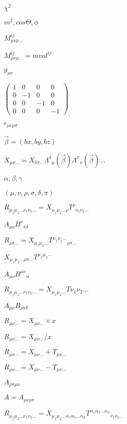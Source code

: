 \documentclass{article}
\begin{document}
$\chi^{2}$
\pagebreak

$m^2,cos\Theta, \phi$
\pagebreak

$ M^{ij}_{\mu\nu\rho\ldots} $
\pagebreak

$ M^{ij}_{\mu\nu\rho\ldots} = mval^{ij} $
\pagebreak

$ g_{\mu\nu} $
\pagebreak

$ \left(\begin{array}{cccc} 1&0&0&0\\0&-1&0&0\\0&0&-1&0\\0&0&0&-1 \end{array}\right) $
\pagebreak

$\epsilon_{\mu\nu\rho\sigma}$
\pagebreak

$\vec{\beta}=(bx,by,bz)$
\pagebreak

$ X_{\mu\nu\ldots} = X_{\delta\pi\ldots} \Lambda^{\delta}{}_{\mu}(\vec{\beta})\Lambda^{\pi}{}_{\nu}(\vec{\beta}) \ldots $
\pagebreak

$ \alpha,\beta,\gamma $
\pagebreak

$ (\mu,\nu,\rho,\sigma,\delta,\pi) $
\pagebreak

$ R_{\mu_1\mu_2\ldots\nu_1\nu_2\ldots} = X_{\mu_1\mu_2\ldots\rho} T^{\rho}{}_{\nu_1\nu_2\ldots} $
\pagebreak

$ A_{\mu\nu} B^{\nu}{}_{\pi\delta} $
\pagebreak

$ R_{\rho\pi\ldots} = X_{\mu_1\mu_2\ldots} T^{\mu_1\mu_2\ldots}{}_{\rho\pi\ldots} $
\pagebreak

$ X_{\mu_1\mu_2\ldots\rho\pi\ldots} T^{\mu_1\mu_2\ldots} $
\pagebreak

$ A_{\mu\nu} B^{\mu\nu}{}_{\alpha} $
\pagebreak

$ R_{\mu_1\mu_2\ldots\nu_1\nu_2\ldots} = X_{\mu_1\mu_2\ldots} T{\nu_1\nu_2\ldots} $
\pagebreak

$ A_{\mu\nu} B_{\rho\pi\delta} $
\pagebreak

$ R_{\mu\nu\ldots} = X_{\mu\nu\ldots} \times x $
\pagebreak

$ R_{\mu\nu\ldots} = X_{\mu\nu\ldots} / x $
\pagebreak

$ R_{\mu\nu\ldots} = X_{\mu\nu\ldots} + T_{\mu\nu\ldots} $
\pagebreak

$ R_{\mu\nu\ldots} = X_{\mu\nu\ldots} - T_{\mu\nu\ldots} $
\pagebreak

$ A_{\rho\pi\mu\nu} $
\pagebreak

$ A = A_{\mu\nu\rho\pi} $
\pagebreak

$ R_{\mu_1\mu_2\ldots\nu_1\nu_2\ldots} = X_{\mu_1\mu_2\ldots\alpha_1\alpha_1\ldots\alpha_n} T^{\alpha_1\alpha_2\ldots\alpha_n}{}_{\nu_1\nu_2\ldots} $
\pagebreak
\end{document}
